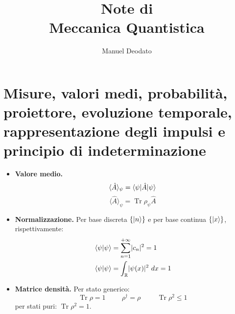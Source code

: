 \documentclass[11pt, a4paper]{scrartcl} %
\title{Note di\\ \vspace{.1in} Meccanica Quantistica}
\author{Manuel Deodato}
\date{}
\numberwithin{equation}{section}
\theoremstyle{style2}
\theoremstyle{style1}
\begin{document}
\section{Misure, valori medi, probabilit\`a, proiettore, evoluzione temporale, rappresentazione degli impulsi e principio di indeterminazione}
\begin{multicols}{2}
	\begin{itemize}
		\item {\sffamily \bfseries Valore medio.} 
			\begin{equation}
				\langle \hat{A} \rangle_\psi = \braket{\psi |\hat{A}|\psi } 
			\end{equation}
			\begin{equation}
				\langle \hat{A} \rangle_\psi  = \operatorname{Tr} \rho_\psi  \hat{A}
			\end{equation}
		\item {\sffamily \bfseries Normalizzazione.} Per base discreta $\left\{ \ket{n}  \right\} $ e per base continua $\left\{ \ket{x}  \right\} $, rispettivamente:
			\begin{equation}
				\begin{split}
					&\braket{\psi |\psi } = \sum_{n=1}^{+\infty} \lvert c_n \rvert ^2= 1\\
					&\braket{\psi |\psi } = \int_\mathbb{R} \lvert \psi (x) \rvert ^2 \ dx = 1 
				\end{split}
			\end{equation}
		\item {\sffamily \bfseries Matrice densit\`a.} Per stato generico:
		\begin{equation}
				\operatorname{Tr} \rho  = 1 \hspace{1cm} \rho ^\dagger = \rho \hspace{1cm} \operatorname{Tr} \rho ^2 \le  1
		\end{equation}	
		per stati puri: $\operatorname{Tr} \rho ^2 = 1$.


\end{itemize}
\end{multicols}
\end{document}

